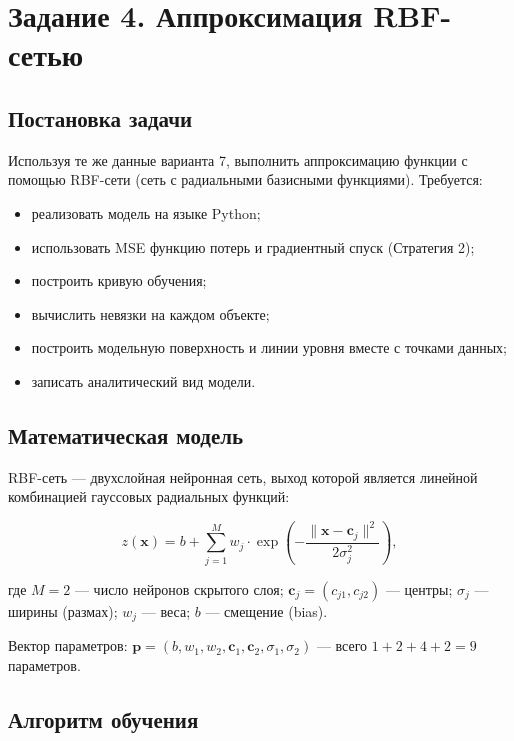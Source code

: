 \section{Задание 4. Аппроксимация RBF-сетью}

\subsection{Постановка задачи}

Используя те же данные варианта 7, выполнить аппроксимацию функции с помощью RBF-сети (сеть с радиальными базисными функциями). Требуется:
\begin{itemize}
    \item реализовать модель на языке Python;
    \item использовать MSE функцию потерь и градиентный спуск (Стратегия 2);
    \item построить кривую обучения;
    \item вычислить невязки на каждом объекте;
    \item построить модельную поверхность и линии уровня вместе с точками данных;
    \item записать аналитический вид модели.
\end{itemize}

\subsection{Математическая модель}

RBF-сеть --- двухслойная нейронная сеть, выход которой является линейной комбинацией гауссовых радиальных функций:

\begin{equation}\label{eq:rbf}
    z(\mathbf{x}) = b + \sum_{j=1}^{M} w_j \cdot \exp\left(-\frac{\|\mathbf{x} - \mathbf{c}_j\|^2}{2\sigma_j^2}\right),
\end{equation}

где $M = 2$ --- число нейронов скрытого слоя; $\mathbf{c}_j = (c_{j1}, c_{j2})$ --- центры; $\sigma_j$ --- ширины (размах); $w_j$ --- веса; $b$ --- смещение (bias).

Вектор параметров: $\mathbf{p} = (b, w_1, w_2, \mathbf{c}_1, \mathbf{c}_2, \sigma_1, \sigma_2)$ --- всего $1 + 2 + 4 + 2 = 9$ параметров.

\subsection{Алгоритм обучения}

